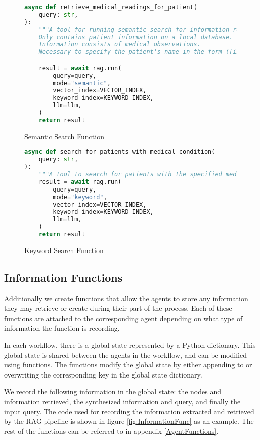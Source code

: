\begin{figure}[h]
	\centering
	\begin{lstlisting}[language=Python, breaklines=true]
async def retrieve_medical_readings_for_patient(
    query: str,
):
    """A tool for running semantic search for information related to a patient.
    Only contains patient information on a local database.
    Information consists of medical observations.
    Necessary to specify the patient's name in the form ([information to search] for [patient name])."""

    result = await rag.run(
        query=query,
        mode="semantic",
        vector_index=VECTOR_INDEX,
        keyword_index=KEYWORD_INDEX,
        llm=llm,
    )
    return result
\end{lstlisting}
	\caption{Semantic Search Function}
	\label{fig:SemanticSearchFunc}
\end{figure}

\begin{figure}[h]
	\centering
	\small
	\begin{lstlisting}[language=Python, breaklines=true]
async def search_for_patients_with_medical_condition(
    query: str,
):
    """A tool to search for patients with the specified medical condition."""
    result = await rag.run(
        query=query,
        mode="keyword",
        vector_index=VECTOR_INDEX,
        keyword_index=KEYWORD_INDEX,
        llm=llm,
    )
    return result
\end{lstlisting}
	\caption{Keyword Search Function}
	\label{fig:KeywordSearch}
\end{figure}

\subsection{Information Functions}

Additionally we create functions that allow the agents to store any information they may retrieve or create during their part of the process. Each of these functions are attached to the corresponding agent depending on what type of information the function is recording.

In each workflow, there is a global state represented by a Python dictionary.
This global state is shared between the agents in the workflow, and can be modified using functions. The functions modify the global state by either appending to or overwriting the corresponding key in the global state dictionary.

We record the following information in the global state: the nodes and information retrieved, the synthesized information and query, and finally the input query. The code used for recording the information extracted and retrieved by the RAG pipeline is shown in figure \ref{fig:InformationFunc} as an example. The rest of the functions can be referred to in appendix \ref{AgentFunctions}.

